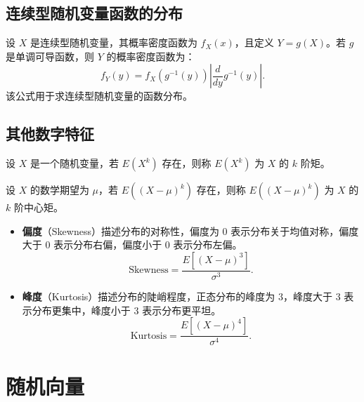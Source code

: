 \documentclass[UTF8]{ctexart}
\begin{document}
	\subsection{连续型随机变量函数的分布}
	
	\begin{tcolorbox}[colback=definition!5!white, colframe=definition!75!black, title=连续型随机变量函数的分布]
		设 $X$ 是连续型随机变量，其概率密度函数为 $f_X(x)$，且定义 $Y = g(X)$。若 $g$ 是单调可导函数，则 $Y$ 的概率密度函数为：
		\[
		f_Y(y) = f_X(g^{-1}(y)) \left| \frac{d}{dy}g^{-1}(y) \right|.
		\]
		该公式用于求连续型随机变量的函数分布。
	\end{tcolorbox}
	
	\subsection{其他数字特征}
	
	\begin{tcolorbox}[colback=definition!5!white, colframe=definition!75!black, title=矩]
		设 $X$ 是一个随机变量，若 $E(X^k)$ 存在，则称 $E(X^k)$ 为 $X$ 的 $k$ 阶矩。
	\end{tcolorbox}
	
	\begin{tcolorbox}[colback=definition!5!white, colframe=definition!75!black, title=中心矩]
		设 $X$ 的数学期望为 $\mu$，若 $E((X - \mu)^k)$ 存在，则称 $E((X - \mu)^k)$ 为 $X$ 的 $k$ 阶中心矩。
	\end{tcolorbox}
	
	\begin{tcolorbox}[colback=definition!5!white, colframe=definition!75!black, title=偏度与峰度]
		\begin{itemize}
			\item \textbf{偏度}（Skewness）描述分布的对称性，偏度为 $0$ 表示分布关于均值对称，偏度大于 $0$ 表示分布右偏，偏度小于 $0$ 表示分布左偏。
			\[
			\text{Skewness} = \frac{E[(X - \mu)^3]}{\sigma^3}.
			\]
			\item \textbf{峰度}（Kurtosis）描述分布的陡峭程度，正态分布的峰度为 $3$，峰度大于 $3$ 表示分布更集中，峰度小于 $3$ 表示分布更平坦。
			\[
			\text{Kurtosis} = \frac{E[(X - \mu)^4]}{\sigma^4}.
			\]
		\end{itemize}
	\end{tcolorbox}
	
	
	\section{随机向量}
	
\end{document}
